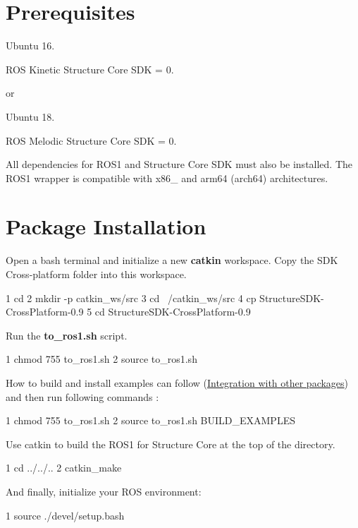 \hypertarget{ros_install_prerequisites}{}\section{Prerequisites}\label{ros_install_prerequisites}

\begin{DoxyItemize}
\item Ubuntu 16.
\item R\+OS Kinetic Structure Core S\+DK = 0.

or
\item Ubuntu 18.
\item R\+OS Melodic Structure Core S\+DK = 0.
\end{DoxyItemize}

All dependencies for R\+O\+S1 and Structure Core S\+DK must also be installed. The R\+O\+S1 wrapper is compatible with x86\+\_ and arm64 (arch64) architectures.\hypertarget{ros_install_package_installation}{}\section{Package Installation}\label{ros_install_package_installation}
Open a bash terminal and initialize a new {\bfseries catkin} workspace. Copy the S\+DK Cross-\/platform folder into this workspace.


\begin{DoxyCode}
1 cd 
2 mkdir -p catkin\_ws/src 
3 cd ~/catkin\_ws/src
4 cp StructureSDK-CrossPlatform-0.9
5 cd StructureSDK-CrossPlatform-0.9
\end{DoxyCode}


Run the {\bfseries to\+\_\+ros1.\+sh} script.


\begin{DoxyCode}
1 chmod 755 to\_ros1.sh
2 source to\_ros1.sh
\end{DoxyCode}


How to build and install examples can follow (\hyperlink{ros_start_integration}{Integration with other packages}) and then run following commands \+:


\begin{DoxyCode}
1 chmod 755 to\_ros1.sh
2 source to\_ros1.sh BUILD\_EXAMPLES
\end{DoxyCode}


Use catkin to build the R\+O\+S1 for Structure Core at the top of the directory.


\begin{DoxyCode}
1 cd ../../..
2 catkin\_make
\end{DoxyCode}


And finally, initialize your R\+OS environment\+:


\begin{DoxyCode}
1 source ./devel/setup.bash
\end{DoxyCode}
 